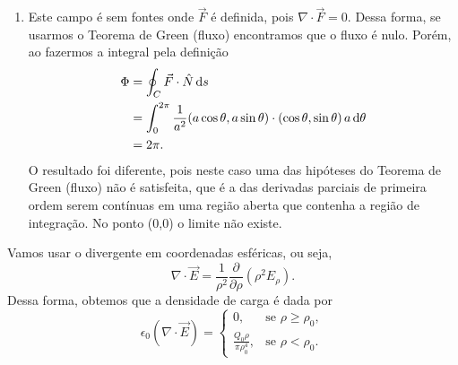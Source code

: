 \begin{questions}
\begin{solution}
\begin{enumerate}[label=(\alph*)]
    \item Este campo é sem fontes onde $\vec F$ é definida, pois $\nabla \cdot \vec F = 0$. Dessa forma, se usarmos o Teorema de Green (fluxo) encontramos que o fluxo é nulo.
    Porém, ao fazermos a integral pela definição
    \begin{align*}
        \Phi &= \oint_C \vec F \cdot \hat N\,\mathrm{d} s \\
            &= \int_0^{2\pi} \frac{1}{a^2}(a\cos\theta, a\sin\theta)\cdot(\cos\theta,\sin\theta)\, a\, \mathrm{d} \theta \\
            &= 2\pi.
    \end{align*}
    O resultado foi diferente, pois neste caso uma das hipóteses do Teorema de Green (fluxo) não é satisfeita, que é a das derivadas parciais de primeira ordem serem contínuas em uma região aberta que contenha a região de integração. No ponto (0,0) o limite não existe.
  \end{enumerate}
\end{solution}

\setcounter{question}{4}
\begin{solution}
    Vamos usar o divergente em coordenadas esféricas, ou seja,
    \[\nabla\cdot \vec E = \frac{1}{\rho^2} \frac{\partial}{\partial \rho} (\rho^2 E_\rho). \]
    Dessa forma, obtemos que a densidade de carga é dada por
    \[
        \epsilon_0 (\nabla\cdot \vec E) =
            \begin{cases}
                0, &\text{se } \rho \ge \rho_0, \\
                \frac{Q_0\rho}{\pi \rho_0^4}, &\text{se } \rho < \rho_0.
            \end{cases}
    \]
\end{solution}


\end{questions}
